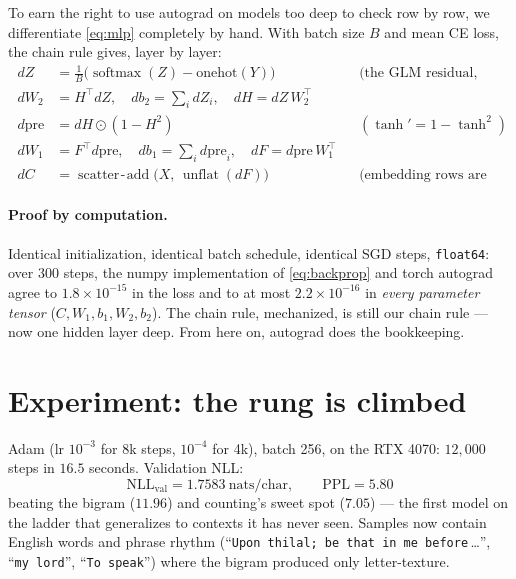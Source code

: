 \documentclass[11pt]{article}
\newcommand{\smax}{\operatorname{softmax}}
\begin{document}
To earn the right to use autograd on models too deep to check row by
row, we differentiate \eqref{eq:mlp} completely by hand. With batch
size $B$ and mean CE loss, the chain rule gives, layer by layer:
\begin{equation}
  \boxed{\;
  \begin{aligned}
  dZ &= \tfrac1B\bigl(\smax(Z) - \mathrm{onehot}(Y)\bigr)
      &&\text{(the GLM residual, again)}\\
  dW_2 &= H^{\!\top} dZ, \quad db_2 = \textstyle\sum_i dZ_i,
      \quad dH = dZ\, W_2^{\!\top}\\
  d\mathrm{pre} &= dH \odot (1 - H^2)
      &&(\tanh' = 1 - \tanh^2)\\
  dW_1 &= F^{\!\top} d\mathrm{pre}, \quad db_1 = \textstyle\sum_i
      d\mathrm{pre}_i, \quad dF = d\mathrm{pre}\, W_1^{\!\top}\\
  dC &= \operatorname{scatter\!-\!add}\bigl(X,\,
      \operatorname{unflat}(dF)\bigr)
      &&\text{(embedding rows are reused)}
  \end{aligned}\;}
  \label{eq:backprop}
\end{equation}

\paragraph{Proof by computation.} Identical initialization, identical
batch schedule, identical SGD steps, \texttt{float64}: over $300$
steps, the numpy implementation of \eqref{eq:backprop} and torch
autograd agree to $1.8\times10^{-15}$ in the loss and to at most
$2.2\times10^{-16}$ in \emph{every parameter tensor} ($C, W_1, b_1,
W_2, b_2$). The chain rule, mechanized, is still our chain rule ---
now one hidden layer deep. From here on, autograd does the bookkeeping.

\section{Experiment: the rung is climbed}

Adam (lr $10^{-3}$ for 8k steps, $10^{-4}$ for 4k), batch 256, on the
RTX 4070: $12{,}000$ steps in $16.5$ seconds. Validation NLL:
\begin{equation}
  \boxed{\;\mathrm{NLL}_{\mathrm{val}} = 1.7583 \ \text{nats/char},
  \qquad \mathrm{PPL} = 5.80\;}
  \label{eq:result}
\end{equation}
beating the bigram ($11.96$) and counting's sweet spot ($7.05$) --- the
first model on the ladder that generalizes to contexts it has never
seen. Samples now contain English words and phrase rhythm
(``\texttt{Upon thilal; be that in me before}\,\ldots'', ``\texttt{my
lord}'', ``\texttt{To speak}'') where the bigram produced only
letter-texture.
\end{document}
